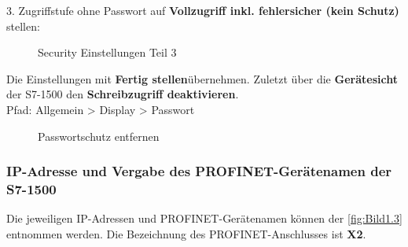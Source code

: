 \clearpage

3. Zugriffstufe ohne Passwort auf \textbf{Vollzugriff inkl. fehlersicher (kein Schutz)} stellen:
\begin{figure}[H]
   \centering
   \caption[Security Einstellungen Teil 3]{Security Einstellungen Teil 3}
   \label{fig:Bild3.9}
\end{figure}

Die Einstellungen mit \glqq\textbf{Fertig stellen}\grqq\:übernehmen. Zuletzt über die \textbf{Gerätesicht} der S7-1500 den \textbf{Schreibzugriff deaktivieren}.\\
Pfad: Allgemein > Display > Passwort 
\begin{figure}[H]
   \centering
   \caption[Passwortschutz entfernen]{Passwortschutz entfernen}
   \label{fig:Bild3.10}
\end{figure}

\clearpage

\subsubsection{IP-Adresse und Vergabe des PROFINET-Gerätenamen der S7-1500} \label{sec: IP-Adresse_PROFINET-Gerätename_S7-1500}
Die jeweiligen IP-Adressen und PROFINET-Gerätenamen können der \autoref{fig:Bild1.3} entnommen werden. Die Bezeichnung des PROFINET-Anschlusses ist \textbf{X2}.

